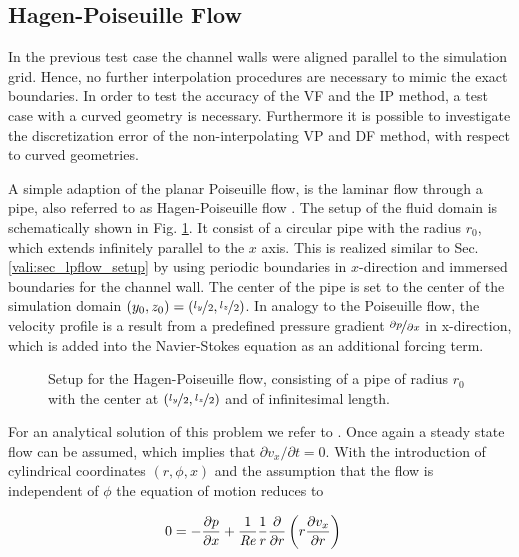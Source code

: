 \subsection{Hagen-Poiseuille Flow}

In the previous test case the channel walls were aligned parallel to the simulation grid. Hence, no further interpolation procedures
are necessary to mimic the exact boundaries.
In order to test the accuracy of the VF and the IP method, a test case with a curved geometry is necessary.
Furthermore it is possible to investigate the discretization error of the non-interpolating VP and DF method, with respect to curved geometries.

A simple adaption of the planar Poiseuille flow, is the laminar flow through a pipe, also referred to as Hagen-Poiseuille flow \citep{tritton88}.
The setup of the fluid domain is schematically shown in Fig. \ref{validation:setup_hpflow}.
It consist of a circular pipe with the radius $r_0$, which extends infinitely parallel to the $x$ axis.
This is realized similar to Sec. \ref{vali:sec_lpflow_setup} by using periodic boundaries in $x$-direction
and immersed boundaries for the channel wall.
The center of the pipe is set to the center of the simulation domain ${(y_0, z_0) = (\nicefrac{l_y}{2}, \nicefrac{l_z}{2})}$.
In analogy to the Poiseuille flow, the velocity profile is a result from a predefined pressure gradient $\nicefrac{\partial p}{\partial x}$ in x-direction,
which  is added into the Navier-Stokes equation as an additional forcing term.

\begin{figure}[!bp]
      \centering
      \caption{Setup for the Hagen-Poiseuille flow, consisting of a pipe of radius $r_0$ with the center at  ${(\nicefrac{l_y}{2}, \nicefrac{l_z}{2})}$ and of infinitesimal length.}
    \label{validation:setup_hpflow}
\end{figure}

For an analytical solution of this problem we refer to \citep{Kundu2012}.
Once again a steady state flow can be assumed, which implies that $\partial v_x/\partial t = 0$. With the introduction of cylindrical coordinates $(r, \phi, x)$
and the assumption that the flow is independent of $\phi$ the equation of motion reduces to

\begin{align}
    \label{vali:hpflow:navstok}
        0 &= - \frac{\partial p}{\partial x}  +  \frac{1}{\mbox{\textit{Re}}} \frac{1}{r}\frac{\partial}{\partial r}\left(r\frac{\partial v_x}{\partial r}\right)
\end{align}


